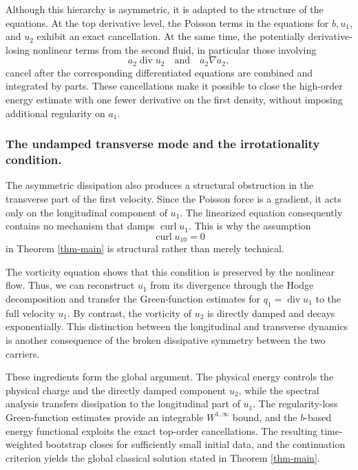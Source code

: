 \documentclass[10pt,reqno]{amsart}
\numberwithin{equation}{section}
\begin{document}
Although this hierarchy is asymmetric, it is adapted to the structure of the equations. At the top derivative level, the Poisson terms in the equations for $b,u_1$, and $u_2$ exhibit an exact cancellation. At the same time, the potentially derivative-losing nonlinear terms from the second fluid, in particular those involving
\[
a_2\operatorname{div}u_2 \quad\text{and}\quad a_2\nabla a_2,
\]
cancel after the corresponding differentiated equations are combined and integrated by parts. These cancellations make it possible to close the high-order energy estimate with one fewer derivative on the first density, without imposing additional regularity on $a_1$.

%
%
%
%
%
%

\subsubsection*{The undamped transverse mode and the irrotationality condition.}

The asymmetric dissipation also produces a structural obstruction in the transverse part of the first velocity. Since the Poisson force is a gradient, it acts only on the longitudinal component of $u_1$. The linearized equation consequently contains no mechanism that damps $\operatorname{curl}u_1$. This is why the assumption
\[
\operatorname{curl}u_{10}=0
\]
in Theorem \ref{thm-main} is structural rather than merely technical.

The vorticity equation shows that this condition is preserved by the nonlinear flow. Thus, we can reconstruct $u_1$ from its divergence through the Hodge decomposition and transfer the Green-function estimates for $q_1=\operatorname{div}u_1$ to the full velocity $u_1$. By contrast, the vorticity of $u_2$ is directly damped and decays exponentially. This distinction between the longitudinal and transverse dynamics is another consequence of the broken dissipative symmetry between the two carriers.

These ingredients form the global argument. The physical energy controls the physical charge and the directly damped component $u_2$, while the spectral analysis transfers dissipation to the longitudinal part of $u_1$. The regularity-loss Green-function estimates provide an integrable $W^{1,\infty}$ bound, and the $b$-based energy functional exploits the exact top-order cancellations. The resulting time-weighted bootstrap closes for sufficiently small initial data, and the continuation criterion yields the global classical solution stated in Theorem \ref{thm-main}.
\end{document}
